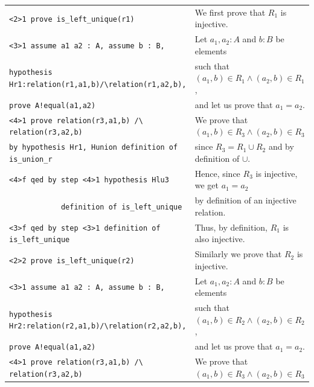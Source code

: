 \documentclass[submission,copyright,creativecommons]{eptcs}
\begin{document}
\begin{table}
\begin{center}
{\begin{tabular}{|ll|}
\hspace{0.8cm}  \verb+<2>1 prove is_left_unique(r1)+ & We first prove
that $R_1$ is injective.\\
\hspace{1.1cm}  \verb+<3>1 assume a1 a2 : A, assume b : B,+ & Let
$a_1,a_2:A$ and $b:B$ be elements\\
\hspace{1.9cm}  \verb+hypothesis Hr1:relation(r1,a1,b)/\relation(r1,a2,b),+ &
such that $(a_1,b) \in R_1 \land (a_2,b) \in R_1$,\\
\hspace{1.9cm}  \verb+prove A!equal(a1,a2)+ &
and let us prove that $a_1=a_2$.\\
\hspace{1.4cm}  \verb+<4>1 prove relation(r3,a1,b) /\ relation(r3,a2,b)+ &
We prove that $(a_1,b) \in R_3 \land (a_2,b) \in R_3$ \\ 
\hspace{2.2cm}  \verb+by hypothesis Hr1, Hunion definition of is_union_r+ &
since $R_3 = R_1 \cup R_2$ and by definition of $\cup$.\\
\hspace{1.4cm}  \verb+<4>f qed by step <4>1 hypothesis Hlu3+ & Hence,
since $R_3$ is injective, we get $a_1=a_2$\\
\hspace{1.4cm}  \verb+            definition of is_left_unique+
& by definition of an injective relation.\\
\hspace{1.1cm}  \verb+<3>f qed by step <3>1 definition of is_left_unique+ & 
Thus, by definition, $R_1$ is also injective. \\
\hspace{0.8cm}  \verb+<2>2 prove is_left_unique(r2)+ & Similarly we prove
that $R_2$ is injective.\\
\hspace{1.1cm}  \verb+<3>1 assume a1 a2 : A, assume b : B,+ & Let
$a_1,a_2:A$ and $b:B$ be elements\\
\hspace{1.9cm}  \verb+hypothesis Hr2:relation(r2,a1,b)/\relation(r2,a2,b),+ &
such that $(a_1,b) \in R_2 \land (a_2,b) \in R_2$,\\
\hspace{1.9cm}  \verb+prove A!equal(a1,a2)+ &
and let us prove that $a_1=a_2$.\\
\hspace{1.4cm}  \verb+<4>1 prove relation(r3,a1,b) /\ relation(r3,a2,b)+ &
We prove that $(a_1,b) \in R_3 \land (a_2,b) \in R_3$ \\ 

\end{tabular}}
\end{center}
\end{table}
\end{document}
